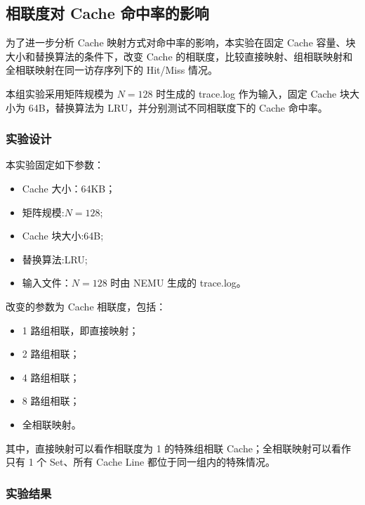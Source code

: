 \subsection{相联度对 Cache 命中率的影响}

为了进一步分析 Cache 映射方式对命中率的影响，本实验在固定 Cache 容量、块大小和替换算法的条件下，改变 Cache 的相联度，比较直接映射、组相联映射和全相联映射在同一访存序列下的 Hit/Miss 情况。

本组实验采用矩阵规模为 $N=128$ 时生成的 trace.log 作为输入，固定 Cache 块大小为 64B，替换算法为 LRU，并分别测试不同相联度下的 Cache 命中率。

\subsubsection{实验设计}

本实验固定如下参数：

\begin{itemize}
    \item Cache 大小：64KB； %
    \item 矩阵规模:$N=128$;
    \item Cache 块大小:64B;
    \item 替换算法:LRU;
    \item 输入文件：$N=128$ 时由 NEMU 生成的 trace.log。
\end{itemize}

改变的参数为 Cache 相联度，包括：

\begin{itemize}
    \item 1 路组相联，即直接映射；
    \item 2 路组相联；
    \item 4 路组相联；
    \item 8 路组相联；
    \item 全相联映射。
\end{itemize}

其中，直接映射可以看作相联度为 1 的特殊组相联 Cache；全相联映射可以看作只有 1 个 Set、所有 Cache Line 都位于同一组内的特殊情况。

\subsubsection{实验结果}

